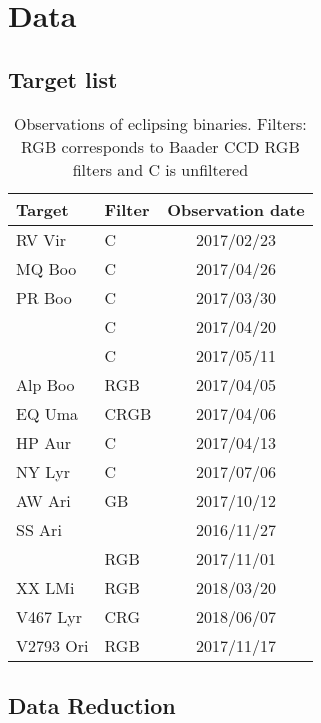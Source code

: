 \chapter{Data}

\section{Target list}
\begin{table}
    \centering
    \begin{tabular}[h]{l l c}
    \toprule
    Target  & Filter    & Observation date \\ \bottomrule
    RV Vir  & C         & 2017/02/23 \\ \midrule
    MQ Boo  & C         & 2017/04/26 \\ \midrule
    PR Boo  & C         & 2017/03/30 \\ \midrule
            & C         & 2017/04/20 \\ \midrule
            & C         & 2017/05/11 \\ \midrule
    Alp Boo & RGB       & 2017/04/05 \\ \midrule
    EQ Uma  & CRGB      & 2017/04/06 \\ \midrule
    HP Aur  & C         & 2017/04/13 \\ \midrule
    NY Lyr  & C         & 2017/07/06 \\ \midrule
    AW Ari  & GB        & 2017/10/12 \\ \midrule
    SS Ari  &           & 2016/11/27 \\ \midrule
            & RGB       & 2017/11/01 \\ \midrule
    XX LMi  & RGB       & 2018/03/20 \\ \midrule
    V467 Lyr    & CRG   & 2018/06/07 \\ \midrule
    V2793 Ori   & RGB   & 2017/11/17 \\
    \bottomrule
    \end{tabular}
    \caption{Observations of eclipsing binaries. Filters: RGB corresponds to Baader CCD RGB filters and C is unfiltered}\label{tab:observations}
\end{table}

\section{Data Reduction}

